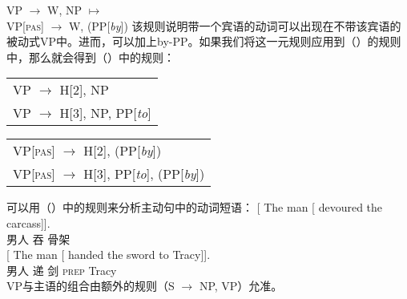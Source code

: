 \ea
VP  $\to$ W, NP $\mapsto$\\
VP[\textsc{pas}]  $\to$ W, (PP[\emph{by}])
\z
该规则说明带一个宾语的动词可以出现在不带该宾语的被动式VP中。进而，可以加上by-PP。如果我们将这一元规则应用到（）的规则中，那么就会得到（）中的规则：
\ea
\begin{tabular}[t]{@{}l@{}}
VP $\to$ H[2], NP\\
VP $\to$ H[3], NP, PP[\emph{to}]\\
\end{tabular}
\z
\ea
\begin{tabular}[t]{@{}l@{}}
VP[\textsc{pas}] $\to$ H[2], (PP[\emph{by}])\\
VP[\textsc{pas}] $\to$ H[3], PP[\emph{to}], (PP[\emph{by}])\\
\end{tabular}
\z
可以用（）中的规则来分析主动句中的动词短语：
\eal
\ex
\gll {} [ The man [ devoured the carcass]].\\
{} {}  男人 {} 吞  骨架\\
\ex
\gll {} [ The man [ handed the sword to Tracy]].\\
{} {}  男人 {} 递  剑 \textsc{prep} Tracy\\
\zl
VP与主语的组合由额外的规则（S $\to$ NP, VP）允准。

